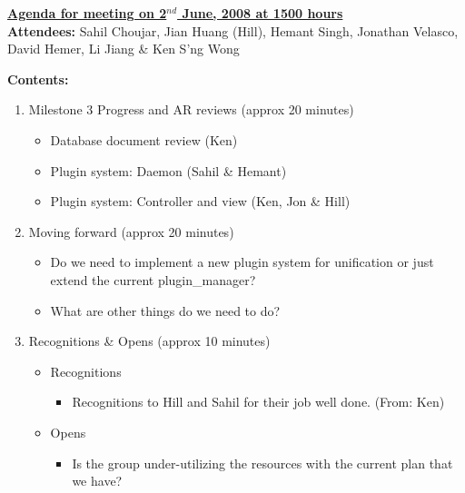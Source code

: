 \documentclass{letter}
\begin{document}
{\large \textbf{\underline{Agenda for meeting on 2$^{nd}$ June, 2008 at 1500 hours}}}\\

\textbf{Attendees:} Sahil Choujar, Jian Huang (Hill), Hemant Singh, Jonathan Velasco, David Hemer, Li Jiang \& Ken S'ng Wong

\textbf{Contents:}

\begin{enumerate}
	\item Milestone 3 Progress and AR reviews (approx 20 minutes)
		\begin{itemize}
			\item Database document review (Ken)
			\item Plugin system: Daemon (Sahil \& Hemant)
			\item Plugin system: Controller and view (Ken, Jon \& Hill)
		\end{itemize}
	\item Moving forward (approx 20 minutes)
		\begin{itemize}
			\item Do we need to implement a new plugin system for unification or just extend the current plugin\_manager? 
			\item What are other things do we need to do?
		\end{itemize}
	\item Recognitions \& Opens (approx 10 minutes)
	     \begin{itemize}
	     	  \item Recognitions
		  			\begin{itemize}
	         		\item Recognitions to Hill and Sahil for their job well done. (From: Ken)
	     		\end{itemize}
		      \item Opens
		          \begin{itemize}
		              \item Is the group under-utilizing the resources with the current plan that we have? 
		          \end{itemize}
	     \end{itemize}
\end{enumerate}
 
\end{document}
